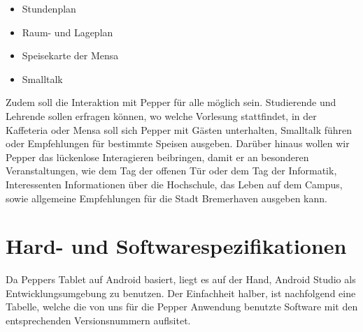 \begin{itemize}
    \item Stundenplan
    \item Raum- und Lageplan
    \item Speisekarte der Mensa
    \item Smalltalk
\end{itemize}

Zudem soll die Interaktion mit Pepper für alle möglich sein. Studierende und Lehrende sollen erfragen können,
wo welche Vorlesung stattfindet, in der Kaffeteria oder Mensa soll sich Pepper mit Gästen unterhalten, Smalltalk führen oder
Empfehlungen für bestimmte Speisen ausgeben. Darüber hinaus wollen wir Pepper das lückenlose Interagieren beibringen, damit er an
besonderen Veranstaltungen, wie dem Tag der offenen Tür oder dem Tag der Informatik, Interessenten Informationen über die Hochschule,
das Leben auf dem Campus, sowie allgemeine Empfehlungen für die Stadt Bremerhaven ausgeben kann.

\section{Hard- und Softwarespezifikationen}
Da Peppers Tablet auf Android basiert, liegt es auf der Hand, Android Studio als Entwicklungsumgebung zu benutzen. Der
Einfachheit halber, ist nachfolgend eine Tabelle, welche die von uns für die Pepper Anwendung benutzte Software mit den
entsprechenden Versionsnummern auflsitet.

